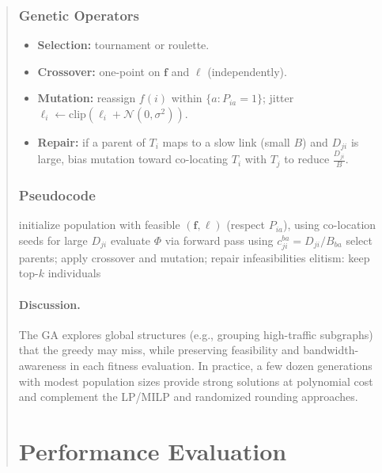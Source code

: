 \documentclass[conference]{IEEEtran}
\begin{document}
\begin{abstract}
\subsubsection{Genetic Operators}
\begin{itemize}
    \item \textbf{Selection:} tournament or roulette.
    \item \textbf{Crossover:} one-point on \(\mathbf{f}\) and \(\boldsymbol{\ell}\) (independently).
    \item \textbf{Mutation:} reassign \(f(i)\) within \(\{a:P_{ia}=1\}\); jitter \(\ell_i\leftarrow\text{clip}(\ell_i+\mathcal{N}(0,\sigma^2))\).
    \item \textbf{Repair:} if a parent of \(T_i\) maps to a slow link (small \(B\)) and \(D_{ji}\) is large, bias mutation toward co-locating \(T_i\) with \(T_j\) to reduce \(\tfrac{D_{ji}}{B}\).
\end{itemize}

\subsubsection{Pseudocode}
\begin{algorithm}[t]
\caption{Genetic Algorithm for Bandwidth/Data-Aware Fog Scheduling}
\label{alg:genetic}
\begin{algorithmic}[1]
\STATE initialize population with feasible \((\mathbf{f},\boldsymbol{\ell})\) (respect \(P_{ia}\)), using co-location seeds for large \(D_{ji}\)
\REPEAT
    \STATE evaluate $\Phi$ via forward pass using $c_{ji}^{ba}=D_{ji}/B_{ba}$
    \STATE select parents; apply crossover and mutation; repair infeasibilities
    \STATE elitism: keep top-$k$ individuals
\end{algorithmic}
\end{algorithm}

\paragraph{Discussion.} The GA explores global structures (e.g., grouping high-traffic subgraphs) that the greedy may miss, while preserving feasibility and bandwidth-awareness in each fitness evaluation. In practice, a few dozen generations with modest population sizes provide strong solutions at polynomial cost and complement the LP/MILP and randomized rounding approaches.


\section{Performance Evaluation} 
\label{performance_analysis}


\end{abstract}
\end{document}
